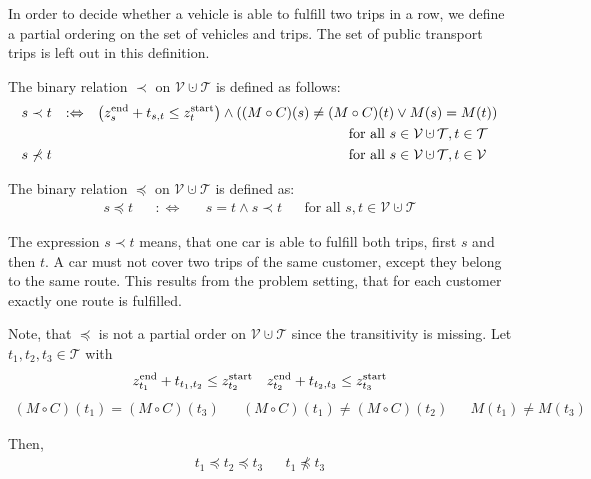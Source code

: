 In order to decide whether a vehicle is able to fulfill two trips in a row, we define a partial ordering on the set of vehicles and trips. The set of public transport trips is left out in this definition.

\begin{definition}
\label{def:partial_order}

The binary relation $\prec$ on $\mathcal{V}\cupdot\mathcal{T}$ is defined as follows:
\begin{align*}
	s\prec t && :\Leftrightarrow && \left(\zend_s + t_{s,t} \leq \zstart_t\right)\land\left((M\circ C)(s)\neq (M\circ C)(t)\lor M(s)=M(t)\right) \\
	&&&& \text{for all } s\in\mathcal{V}\cupdot\mathcal{T}, t\in\mathcal{T} \hphantom{\mathcal{V}} \\
	s\not\prec t &&&& \text{for all } s\in\mathcal{V}\cupdot\mathcal{T}, t\in\mathcal{V} \hphantom{\mathcal{T}}
\end{align*}

The binary relation $\preceq$ on $\mathcal{V}\cupdot\mathcal{T}$ is defined as:
\begin{align*}
	s\preceq t && :\Leftrightarrow && s=t \land s\prec t && \text{for all } s,t\in\mathcal{V}\cupdot\mathcal{T}
\end{align*}

\end{definition}

The expression $s\prec t$ means, that one car is able to fulfill both trips, first $s$ and then $t$. A car must not cover two trips of the same customer, except they belong to the same route. This results from the problem setting, that for each customer exactly one route is fulfilled. 

\begin{remark}

Note, that $\preceq$ is not a partial order on $\mathcal{V}\cupdot\mathcal{T}$ since the transitivity is missing. Let $t_1,t_2,t_3\in\mathcal{T}$ with 
\begin{align*}
	z^{\operatorname{end}}_{t_1} + t_{t_1,t_2} \leq z^{\operatorname{start}}_{t_2} && z^{\operatorname{end}}_{t_2} + t_{t_2,t_3} \leq z^{\operatorname{start}}_{t_3}
\end{align*}
\begin{align*}
	(M\circ C)\left(t_1\right) = (M\circ C)\left(t_3\right) && (M\circ C)\left(t_1\right) \neq (M\circ C)\left(t_2\right) && M\left(t_1\right)\neq M\left(t_3\right)
\end{align*}

Then,
\begin{align*}
	t_1 \preceq t_2 \preceq t_3 && t_1 \not\preceq t_3
\end{align*}

\end{remark}

